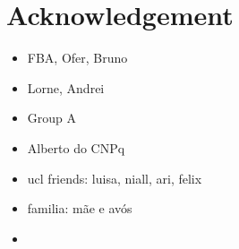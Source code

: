%
\chapter*{Acknowledgement}
\label{sec:acknowledgement}
\vspace*{-10mm}

\begin{itemize}
    \item FBA, Ofer, Bruno
    \item Lorne, Andrei
    \item Group A
    \item Alberto do CNPq
    \item ucl friends: luisa, niall, ari, felix
    \item familia: mãe e avós
    \item 
\end{itemize}

\Blindtext[2][1]
